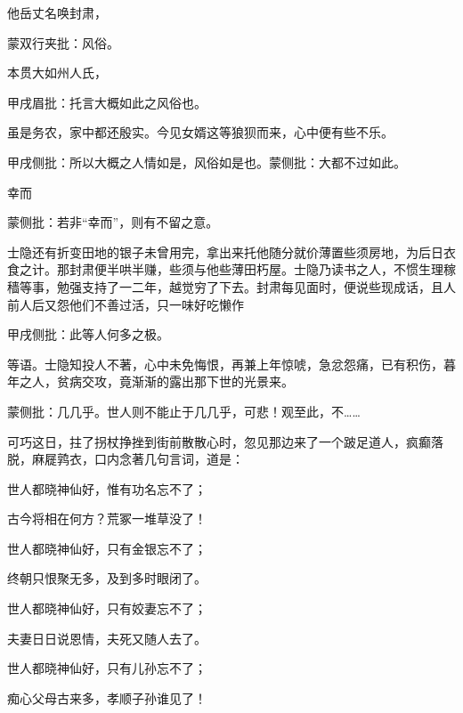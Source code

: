 \begin{parag}
    他岳丈名唤封肃，\begin{note}蒙双行夹批：风俗。\end{note}本贯大如州人氏，\begin{note}甲戌眉批：托言大概如此之风俗也。\end{note}虽是务农，家中都还殷实。今见女婿这等狼狈而来，心中便有些不乐。\begin{note}甲戌侧批：所以大概之人情如是，风俗如是也。蒙侧批：大都不过如此。\end{note}幸而\begin{note}蒙侧批：若非“幸而”，则有不留之意。\end{note}士隐还有折变田地的银子未曾用完，拿出来托他随分就价薄置些须房地，为后日衣食之计。那封肃便半哄半赚，些须与他些薄田朽屋。士隐乃读书之人，不惯生理稼穑等事，勉强支持了一二年，越觉穷了下去。封肃每见面时，便说些现成话，且人前人后又怨他们不善过活，只一味好吃懒作\begin{note}甲戌侧批：此等人何多之极。\end{note}等语。士隐知投人不著，心中未免悔恨，再兼上年惊唬，急忿怨痛，已有积伤，暮年之人，贫病交攻，竟渐渐的露出那下世的光景来。\begin{note}蒙侧批：几几乎。世人则不能止于几几乎，可悲！观至此，不……\end{note}
\end{parag}


\begin{parag}
    可巧这日，拄了拐杖挣挫到街前散散心时，忽见那边来了一个跛足道人，疯癫落脱，麻屣鹑衣，口内念著几句言词，道是：
\end{parag}


\begin{poem}
    \begin{pl}世人都晓神仙好，惟有功名忘不了；\end{pl}

    \begin{pl}古今将相在何方？荒冢一堆草没了！\end{pl}

    \begin{pl}世人都晓神仙好，只有金银忘不了；\end{pl}

    \begin{pl}终朝只恨聚无多，及到多时眼闭了。\end{pl}

    \begin{pl}世人都晓神仙好，只有姣妻忘不了；\end{pl}

    \begin{pl}夫妻日日说恩情，夫死又随人去了。\end{pl}

    \begin{pl}世人都晓神仙好，只有儿孙忘不了；\end{pl}

    \begin{pl}痴心父母古来多，孝顺子孙谁见了！\end{pl}
\end{poem}


